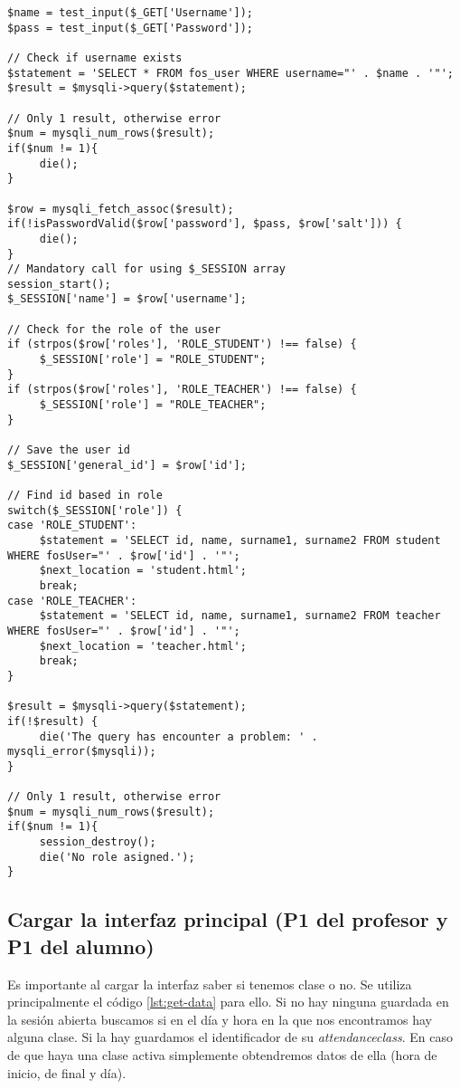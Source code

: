 \noindent
\begin{lstlisting}[caption=Autenticación del usuario.,label={lst:autenticacion}]
$name = test_input($_GET['Username']);
$pass = test_input($_GET['Password']);
   
// Check if username exists
$statement = 'SELECT * FROM fos_user WHERE username="' . $name . '"'; 
$result = $mysqli->query($statement);

// Only 1 result, otherwise error
$num = mysqli_num_rows($result);
if($num != 1){
     die();
}

$row = mysqli_fetch_assoc($result);
if(!isPasswordValid($row['password'], $pass, $row['salt'])) {
     die();
}
// Mandatory call for using $_SESSION array
session_start();
$_SESSION['name'] = $row['username'];

// Check for the role of the user
if (strpos($row['roles'], 'ROLE_STUDENT') !== false) {
     $_SESSION['role'] = "ROLE_STUDENT";
}
if (strpos($row['roles'], 'ROLE_TEACHER') !== false) {
     $_SESSION['role'] = "ROLE_TEACHER";
}

// Save the user id
$_SESSION['general_id'] = $row['id'];
  
// Find id based in role
switch($_SESSION['role']) {
case 'ROLE_STUDENT':
     $statement = 'SELECT id, name, surname1, surname2 FROM student WHERE fosUser="' . $row['id'] . '"';
     $next_location = 'student.html';
     break;	
case 'ROLE_TEACHER':
     $statement = 'SELECT id, name, surname1, surname2 FROM teacher WHERE fosUser="' . $row['id'] . '"';
     $next_location = 'teacher.html';
     break;
}    

$result = $mysqli->query($statement);
if(!$result) {
     die('The query has encounter a problem: ' . mysqli_error($mysqli));
}
  
// Only 1 result, otherwise error
$num = mysqli_num_rows($result);
if($num != 1){
     session_destroy();
     die('No role asigned.');
}
\end{lstlisting}

\subsection{Cargar la interfaz principal (P1 del profesor y P1 del alumno)}
\label{diseno-e-implementacion:logica-negocio:carga}

Es importante al cargar la interfaz saber si tenemos clase o no. Se utiliza principalmente el código \ref{lst:get-data} para ello. Si no hay ninguna guardada en la sesión abierta buscamos si en el día y hora en la que nos encontramos hay alguna clase. Si la hay guardamos el identificador de su \textit{attendanceclass}. En caso de que haya una clase activa simplemente obtendremos datos de ella (hora de inicio, de final y día).\\


